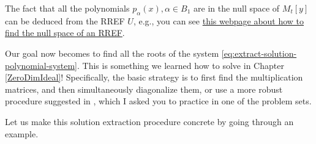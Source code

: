 \documentclass[
]{book}
\theoremstyle{definition}
\theoremstyle{definition}
\theoremstyle{definition}
\theoremstyle{definition}
\theoremstyle{remark}
\begin{document}
The fact that all the polynomials \(p_{\alpha}(x), \alpha \in B_1\) are in the null space of \(M_t[y]\) can be deduced from the RREF \(U\), e.g., you can see \href{https://people.math.carleton.ca/~kcheung/math/notes/MATH1107/wk09/09_basis_for_nullspace.html}{this webpage about how to find the null space of an RREF}.

Our goal now becomes to find all the roots of the system \eqref{eq:extract-solution-polynomial-system}. This is something we learned how to solve in Chapter \ref{ZeroDimIdeal}! Specifically, the basic strategy is to first find the multiplication matrices, and then simultaneously diagonalize them, or use a more robust procedure suggested in \citep{corless1997reordered}, which I asked you to practice in one of the problem sets.

Let us make this solution extraction procedure concrete by going through an example.
\end{document}
